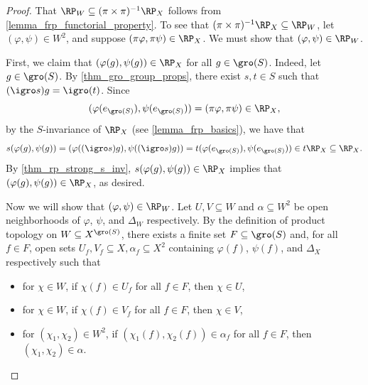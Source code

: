 \begin{proof}
    That $\RP_W \subseteq (\pi \times \pi)^{-1} \RP_X$ follows from \cref{lemma_frp_functorial_property}.  To see that $(\pi \times \pi)^{-1} \RP_X \subseteq \RP_W$, let $(\varphi, \psi) \in W^2$, and suppose $(\pi \varphi, \pi \psi) \in \RP_X$.  We must show that $(\varphi, \psi) \in \RP_W$.
    
    First, we claim that $(\varphi(g), \psi(g)) \in \RP_X$ for all $g \in \gro(S)$.  Indeed, let $g \in \gro(S)$.  By \cref{thm_gro_group_props}, there exist $s, t \in S$ such that $(\igro s)g = \igro(t)$.  Since
    \[
        (\varphi(e_{\gro(S)}), \psi(e_{\gro(S)})) = (\pi \varphi, \pi \psi) \in \RP_X,
    \]
    by the $S$-invariance of $\RP_X$ (see \cref{lemma_frp_basics}), we have that
    \[
        s(\varphi(g), \psi(g)) = (\varphi((\igro s)g), \psi((\igro s)g)) = t (\varphi(e_{\gro(S)}), \psi(e_{\gro(S)})) \in t\RP_X \subseteq \RP_X.
    \]
    By \cref{thm_rp_strong_s_inv}, $s(\varphi(g), \psi(g)) \in \RP_X$ implies that $(\varphi(g), \psi(g)) \in \RP_X$, as desired.

    Now we will show that $(\varphi, \psi) \in \RP_W$.  Let $U, V \subseteq W$ and $\alpha \subseteq W^2$ be open neighborhoods of $\varphi$, $\psi$, and $\Delta_W$ respectively. By the definition of product topology on $W \subseteq X^{\gro(S)}$, there exists a finite set $F \subseteq \gro(S)$ and, for all $f \in F$, open sets $U_f, V_f \subseteq X, \alpha_f \subseteq X^2$ containing $\varphi(f)$, $\psi(f)$, and $\Delta_X$ respectively such that
    \begin{itemize}
        \item for $\chi \in W$, if $\chi(f) \in U_f$ for all $f \in F$, then $\chi \in U$,

        \item for $\chi \in W$, if $\chi (f) \in V_f$ for all $f \in F$, then $\chi \in V$,

        \item for $(\chi_1, \chi_2) \in W^2$, if $(\chi_1(f), \chi_2(f)) \in \alpha_f$ for all $f \in F$, then $(\chi_1, \chi_2) \in \alpha$.
    \end{itemize}
    

\end{proof}
